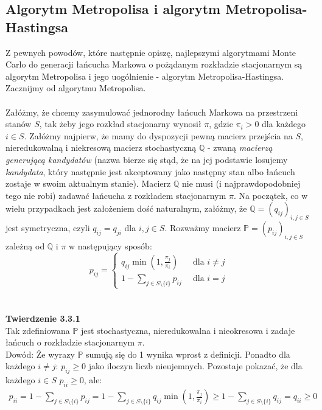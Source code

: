 \documentclass[a4paper]{article}
\begin{document}
\subsection{Algorytm Metropolisa i algorytm Metropolisa-Hastingsa}
Z pewnych powodów, które następnie opiszę, najlepszymi algorytmami Monte Carlo do generacji łańcucha Markowa o pożądanym rozkładzie stacjonarnym są algorytm Metropolisa i jego uogólnienie - algorytm Metropolisa-Hastingsa. Zacznijmy od algorytmu Metropolisa.\\\\
Załóżmy, że chcemy zasymulować jednorodny łańcuch Markowa na przestrzeni stanów $S$, tak żeby jego rozkład stacjonarny wynosił $\pi$, gdzie $\pi_i > 0$ dla każdego $i \in S$. Załóżmy najpierw, że mamy do dyspozycji pewną macierz przejścia na $S$, nieredukowalną i niekresową macierz stochastyczną $\mathbb{Q}$ - zwaną \textit{macierzą generującą kandydatów} (nazwa bierze się stąd, że na jej podstawie losujemy \textit{kandydata}, który następnie jest akceptowany jako następny stan albo łańcuch zostaje w swoim aktualnym stanie). Macierz $\mathbb{Q}$ nie musi (i najprawdopodobniej tego nie robi) zadawać łańcucha z rozkładem stacjonarnym $\pi$. Na początek, co w wielu przypadkach jest założeniem dość naturalnym, załóżmy, że $\mathbb{Q} = (q_{ij})_{i,j \in S}$ jest symetryczna, czyli $q_{ij} = q_{ji}$ dla $i,j \in S$. Rozważmy macierz $\mathbb{P} = (p_{ij})_{i,j \in S}$ zależną od $\mathbb{Q}$ i $\pi$ w następujący sposób:
$$
    p_{ij} = \begin{cases} q_{ij} \min(1, \frac{\pi_j}{\pi_i}) \,\,\,&\text{dla $i \neq j$}\\
                    1 - \sum\limits_{j \in S \setminus \{i\}} p_{ij}\,\,\, &\text{dla $i = j$}
            \end{cases}
$$
\\\\
\textbf{Twierdzenie 3.3.1}\\
Tak zdefiniowana $\mathbb{P}$ jest stochastyczna, nieredukowalna i nieokresowa i zadaje łańcuch o rozkładzie stacjonarnym $\pi$.\\
Dowód: Że wyrazy $\mathbb{P}$ sumują się do 1 wynika wprost z definicji. Ponadto dla każdego $i \neq j$: $p_{ij} \geq 0$ jako iloczyn liczb nieujemnych. Pozostaje pokazać, że dla każdego $i \in S$ $p_{ii} \geq 0$, ale:
\begin{align*}
    p_{ii} = 1 - \sum\limits_{j \in S\setminus \{i\}} p_{ij} = 1 - \sum\limits_{j \in S\setminus \{i\}} q_{ij}\min(1, \frac{\pi_j}{\pi_i}) \geq 1 - \sum\limits_{j \in S\setminus \{i\}} q_{ij} = q_{ii} \geq 0
\end{align*}
\end{document}
